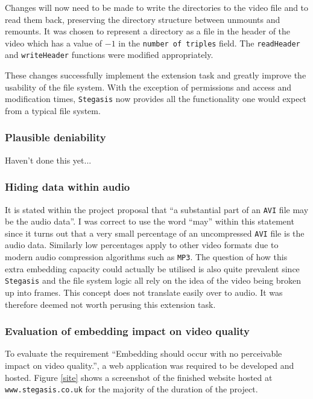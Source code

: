 \documentclass[paper=a4, fontsize=11pt,twoside]{scrartcl}
\numberwithin{table}{section}
\numberwithin{figure}{section}
\numberwithin{algorithm}{section}
\begin{document}
Changes will now need to be made to write the directories to the video file and to read them back, preserving the directory structure between unmounts and remounts. It was chosen to represent a directory as a file in the header of the video which has a value of $-1$ in the \texttt{number of triples} field. The \texttt{readHeader} and \texttt{writeHeader} functions were modified appropriately.

These changes successfully implement the extension task and greatly improve the usability of the file system. With the exception of permissions and access and modification times, \texttt{Stegasis} now provides all the functionality one would expect from a typical file system.


\subsubsection{Plausible deniability}

Haven't done this yet...

\subsubsection{Hiding data within audio}

It is stated within the project proposal that ``a substantial part of an \texttt{AVI} file may be the audio data''. I was correct to use the word ``may'' within this statement since it turns out that a very small percentage of an uncompressed \texttt{AVI} file is the audio data. Similarly low percentages apply to other video formats due to modern audio compression algorithms such as \texttt{MP3}. The question of how this extra embedding capacity could actually be utilised is also quite prevalent since \texttt{Stegasis} and the file system logic all rely on the idea of the video being broken up into frames. This concept does not translate easily over to audio. It was therefore deemed not worth perusing this extension task. 

\subsubsection{Evaluation of embedding impact on video quality}

To evaluate the requirement ``Embedding should occur with no perceivable impact on video quality.'', a web application was required to be developed and hosted. Figure \ref{site} shows a screenshot of the finished website hosted at \texttt{www.stegasis.co.uk} for the majority of the duration of the project.
\end{document}
